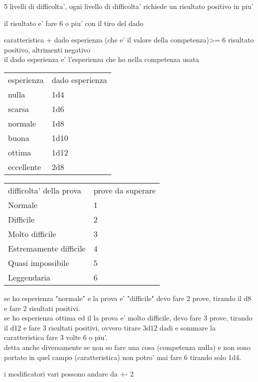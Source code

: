\documentclass[12pt,a4paper]{book}
\begin{document}
	
5 livelli di difficolta', ogni livello di difficolta' richiede un risultato positivo in piu'

il risultato e' fare 6 o piu' con il tiro del dado

caratteristica  + dado esperienza (che e' il valore della competenza)>= 6 risultato positivo, altrimenti negativo\\
il dado esperienza e' l'esperienza che ho nella competenza usata\\

\medskip

\begin{tabular}{ll}
	\hline
esperienza & dado esperienza\\
nulla		&	1d4	\\
scarsa		&	1d6	\\
normale		&   1d8	\\
buona		&	1d10\\
ottima		&	1d12\\	
eccellente	&	2d8\\
\end{tabular}

\medskip

\begin{tabular}{ll}
	\hline
difficolta' della prova & prove da superare\\
	Normale          			& 1\\
	Difficile        			& 2\\
	Molto difficile 	 		& 3\\
	Estremamente difficile      & 4\\
	Quasi impossibile			& 5\\
	Leggendaria      			& 6\\
\end{tabular}

\medskip

se ho esperienza "normale" e la prova e' "difficile" devo fare 2 prove, tirando il d8 e fare 2 risultati positivi.\\
se ho esperienza ottima ed il la prova e' molto difficile, devo fare 3 prove, tirando il d12 e fare 3 risultati positivi, ovvero tirare 3d12 dadi e sommare la caratteristica  fare 3 volte 6 o piu'.\\

detta anche diversamente se non so fare una cosa (competenza nulla) e non sono portato in quel campo (caratteristica) non potro' mai fare 6 tirando solo 1d4.

i modificatori vari possono andare da +- 2\\
\end{document}

